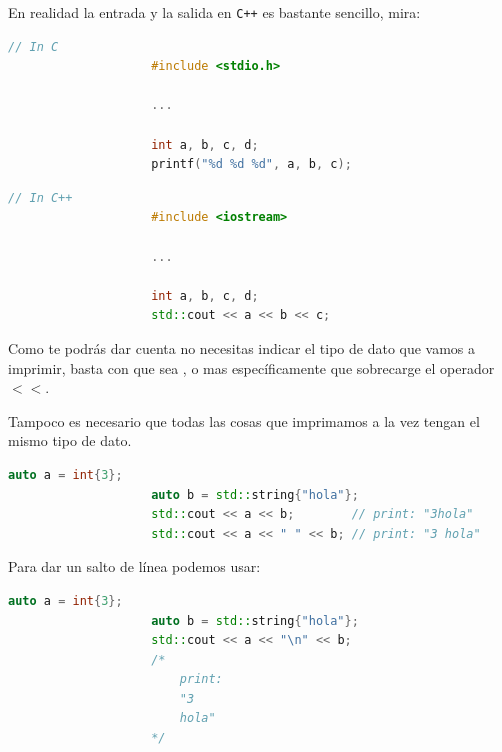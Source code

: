 \documentclass[12pt, fleqn]{report}                             %
\newcommand \Quote              {\qq}                           %
\theoremstyle{break}                                            %
\newcommand{\textCode}[1]  { \texttt{#1} }                      %
\newcommand{\Cpp}{\ignorespaces\textCode{C++}}                  %
\begin{document}
                En realidad la entrada y la salida en \Cpp es bastante sencillo, mira:
                \begin{lstlisting}[language=C++, gobble=20]
                    // In C
                    #include <stdio.h>

                    ...

                    int a, b, c, d;
                    printf("%d %d %d", a, b, c); 
                \end{lstlisting}

                \begin{lstlisting}[language=C++, gobble=20]
                    // In C++
                    #include <iostream>

                    ...

                    int a, b, c, d;
                    std::cout << a << b << c;
                \end{lstlisting}


                Como te podrás dar cuenta no necesitas indicar el tipo de dato que vamos a imprimir, 
                basta con que sea \Quote{imprimible}, o mas específicamente que sobrecarge el operador
                $<<$.
                
                Tampoco es necesario que todas las cosas que imprimamos a la vez tengan el mismo tipo de dato.
                \begin{lstlisting}[language=C++, gobble=20]
                    auto a = int{3};
                    auto b = std::string{"hola"};
                    std::cout << a << b;        // print: "3hola"
                    std::cout << a << " " << b; // print: "3 hola"
                \end{lstlisting}

                Para dar un salto de línea podemos usar:
                \begin{lstlisting}[language=C++, gobble=20]
                    auto a = int{3};
                    auto b = std::string{"hola"};
                    std::cout << a << "\n" << b;        
                    /*
                        print:
                        "3
                        hola"
                    */

                \end{lstlisting}

\end{document}
